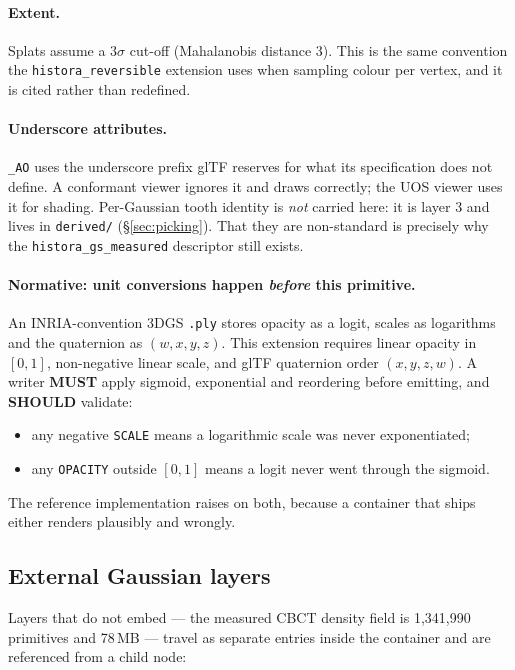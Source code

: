 \documentclass[11pt,a4paper]{article}
\newcommand{\MUST}{\textcolor{uosred}{\textbf{MUST}}}
\newcommand{\SHOULD}{\textcolor{uosamber}{\textbf{SHOULD}}}
\newcommand{\code}[1]{\texttt{\small #1}}
\begin{document}
\paragraph{Extent.} Splats assume a $3\sigma$ cut-off (Mahalanobis distance 3). This is the
same convention the \code{histora\_reversible} extension uses when sampling colour per vertex,
and it is cited rather than redefined.

\paragraph{Underscore attributes.} \code{\_AO} uses the underscore prefix glTF reserves
for what its specification does not define. A conformant viewer ignores it and draws
correctly; the UOS viewer uses it for shading. Per-Gaussian tooth identity is \emph{not}
carried here: it is layer 3 and lives in \code{derived/} (\S\ref{sec:picking}). That they are non-standard is precisely why the \code{histora\_gs\_measured}
descriptor still exists.

\paragraph{Normative: unit conversions happen \emph{before} this primitive.}
An INRIA-convention 3DGS \code{.ply} stores opacity as a logit, scales as logarithms and
the quaternion as $(w,x,y,z)$. This extension requires linear opacity in $[0,1]$,
non-negative linear scale, and glTF quaternion order $(x,y,z,w)$. A writer \MUST{} apply
sigmoid, exponential and reordering before emitting, and \SHOULD{} validate:
\begin{itemize}
  \item any negative \code{SCALE} means a logarithmic scale was never exponentiated;
  \item any \code{OPACITY} outside $[0,1]$ means a logit never went through the sigmoid.
\end{itemize}
The reference implementation raises on both, because a container that ships either renders
plausibly and wrongly.

\subsection{External Gaussian layers}\label{sec:gsnodes}

Layers that do not embed --- the measured CBCT density field is 1{,}341{,}990 primitives
and 78\,MB --- travel as separate entries inside the container and are referenced from a
child node:
\end{document}
